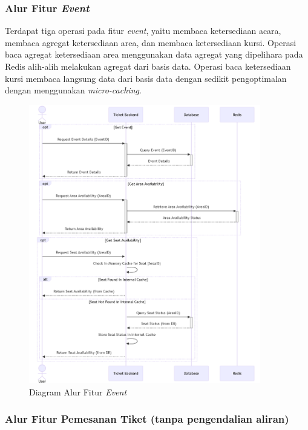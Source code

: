 \pagebreak

\subsubsection{Alur Fitur \textit{Event}}

Terdapat tiga operasi pada fitur \textit{event}, yaitu membaca ketersediaan acara, membaca agregat ketersediaan area, dan membaca ketersediaan kursi. Operasi baca agregat ketersediaan area menggunakan data agregat yang dipelihara pada Redis alih-alih melakukan agregat dari basis data. Operasi baca ketersediaan kursi membaca langsung data dari basis data dengan sedikit pengoptimalan dengan menggunakan \textit{micro-caching}.

\begin{figure}[h]
    \centering
    \includegraphics[width=0.9\textwidth]{resources/chapter-3/event-flow.png}
    \caption{Diagram Alur Fitur \textit{Event}}
    \label{fig:flow-event}
\end{figure}

\pagebreak

\subsubsection{Alur Fitur Pemesanan Tiket (tanpa pengendalian aliran)}


